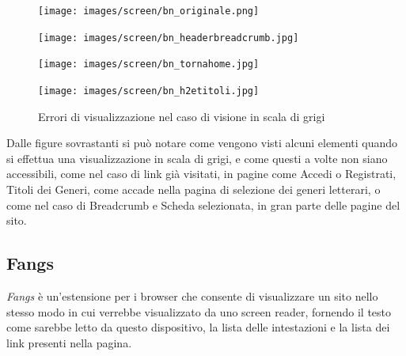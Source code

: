 \begin{figure}[H]
\begin{minipage}{0.45\textwidth}
\texttt{[image: images/screen/bn\_originale.png]}
\end{minipage}
\hspace{\fill}
\begin{minipage}{0.45\textwidth}
\texttt{[image: images/screen/bn\_headerbreadcrumb.jpg]}
\end{minipage}
\vspace*{0.5cm}
\begin{minipage}{0.45\textwidth}
\texttt{[image: images/screen/bn\_tornahome.jpg]}
\end{minipage}
\hspace{\fill}
\begin{minipage}{0.45\textwidth}
\texttt{[image: images/screen/bn\_h2etitoli.jpg]}
\end{minipage}
\caption{Errori di visualizzazione nel caso di visione in scala di grigi}\label{multiavp}
\end{figure}

Dalle figure sovrastanti si può notare come vengono visti alcuni elementi quando si effettua una visualizzazione in scala di grigi, e come questi a volte non siano accessibili, come nel caso di link già visitati, in pagine come Accedi o Registrati, Titoli dei Generi, come accade nella pagina di selezione dei generi letterari, o come nel caso di Breadcrumb e Scheda selezionata, in gran parte delle pagine del sito.

\subsection{Fangs}\label{sec:fangs} %
\textit{Fangs} è un'estensione per i browser che consente di visualizzare un
sito nello stesso modo in cui verrebbe visualizzato da uno screen reader,
fornendo il testo come sarebbe letto da questo dispositivo, la lista delle
intestazioni e la lista dei link presenti nella pagina.

